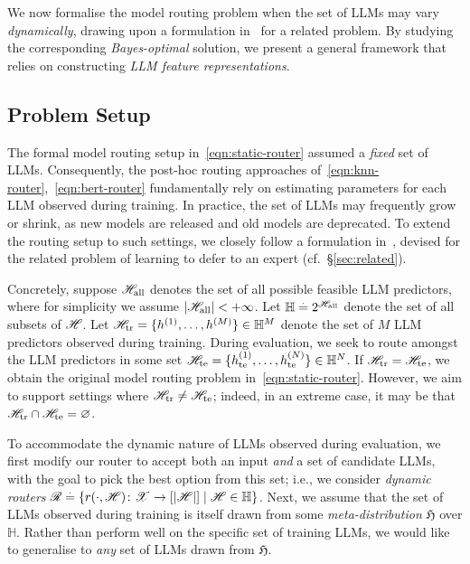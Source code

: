

We now formalise the model routing problem when the set of LLMs may vary \emph{dynamically},
drawing upon a formulation in~\citet{Tailor:2024} for a related problem.
By studying the 
corresponding
\emph{Bayes-optimal} solution,
we present a general framework
that relies on constructing \emph{LLM feature representations}.

\subsection{Problem Setup}

The formal model routing setup in~\eqref{eqn:static-router}
assumed a \emph{fixed} set of LLMs.
Consequently, the post-hoc routing approaches of~\eqref{eqn:knn-router},~\eqref{eqn:bert-router}
fundamentally rely on estimating parameters for each LLM observed during training.
In practice, the set of LLMs may frequently grow or shrink,
as new models are released and old models are deprecated.
To extend the routing setup to such settings,
we closely follow a formulation in~\citet{Tailor:2024},
devised for the related problem of learning to defer to an expert (cf.~\S\ref{sec:related}).

Concretely, 
suppose 
$\mathscr{H}_{\rm all}$ denotes the set of all possible feasible LLM predictors,
where for simplicity we assume $| \mathscr{H}_{\rm all} | < +\infty$.
Let $\mathbb{H} \stackrel{.}{=} 2^{\mathscr{H}_{\mathrm{all}}}$ 
denote the set of all subsets of $\mathscr{H}$. 
Let
$\mathscr{H}_{\rm tr} = \{ h^{(1)}, \ldots, h^{(M)} \} \in \mathbb{H}^M$ 
denote the set of $M$ LLM predictors observed during training.
During evaluation,
we seek to route amongst the LLM predictors in some set 
$\mathscr{H}_{\rm te} = \{ h_{\mathrm{te}}^{(1)}, \ldots, h_{\mathrm{te}}^{(N)} \} \in \mathbb{H}^N$.
If $\mathscr{H}_{\rm tr} = \mathscr{H}_{\rm te}$, 
we obtain the original model routing problem in~\eqref{eqn:static-router}.
However, we aim to support settings where
$\mathscr{H}_{\rm tr} \neq \mathscr{H}_{\rm te}$;
indeed, in an extreme case, it may be that 
$\mathscr{H}_{\rm tr} \cap \mathscr{H}_{\rm te} = \varnothing$.

To accommodate the dynamic nature of LLMs observed during evaluation, 
we first modify our router to accept both an input \emph{and} a set of candidate LLMs,
with the goal to pick the best option from this set;
i.e.,
we consider 
\emph{dynamic routers}
$\mathscr{R} \stackrel{.}{=} \{ r( \cdot, {\mathscr{H}} ) \colon \mathscr{X} \to [| \mathscr{H} |] \mid \mathscr{H} \in \mathbb{H} \}$.
Next, we assume that the set of LLMs observed during training is itself drawn from some \emph{meta-distribution} $\mathfrak{H}$ over $\mathbb{H}$. 
Rather than perform well on the specific set of training LLMs,
we would like to generalise to \emph{any} set of LLMs drawn from $\mathfrak{H}$.

